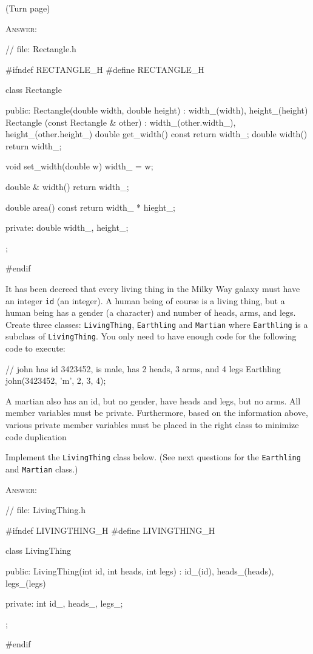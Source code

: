 (Turn page)

\newpage
\textsc{Answer:}
\begin{answercode}
// file: Rectangle.h

#ifndef RECTANGLE_H
#define RECTANGLE_H

class Rectangle
{
public:
Rectangle(double width, double height)
: width_(width), height_(height)
{}
Rectangle (const Rectangle & other)
: width_(other.width_), height_(other.height_)
{}
double get_width() const
{
  return width_;
}
double width()
{
  return width_;
}

void set_width(double w)
{
  width_ = w;
}

double & width()
{
  return width_;
}

double area() const
{
  return width_ * hieght_;
}

private:
double width_, height_;
};

#endif
\end{answercode}


\newpage
\nextq
It has been decreed that every living thing in the Milky Way galaxy must have
an integer \verb!id! (an integer).
A human being of course is a living thing,
but a human being has a gender (a character) and number of heads, arms, and
legs.
Create three classes: \verb!LivingThing!, \verb!Earthling! and
\verb!Martian! where
\verb!Earthling! is a subclass of \verb!LivingThing!.
You only need to have enough code for the following code to execute:
\begin{console}[fontsize=\small]
// john has id 3423452, is male, has 2 heads, 3 arms, and 4 legs
Earthling john(3423452, 'm', 2, 3, 4);
\end{console}
A martian also has an id, but no gender, have heads and legs, but no arms.
All member variables must be private.
Furthermore, based on the information above, various private member variables
must be placed in the right class to minimize code duplication

Implement the \verb!LivingThing! class below.
(See next questions for the \verb!Earthling! and \verb!Martian! class.)

\textsc{Answer:}
\begin{answercode}
// file: LivingThing.h

#ifndef LIVINGTHING_H
#define LIVINGTHING_H

class LivingThing
{
  public:
  LivingThing(int id, int heads, int legs)
  : id_(id), heads_(heads), legs_(legs)
  {}
  
  private:
  int id_, heads_, legs_;
};

#endif
\end{answercode}


